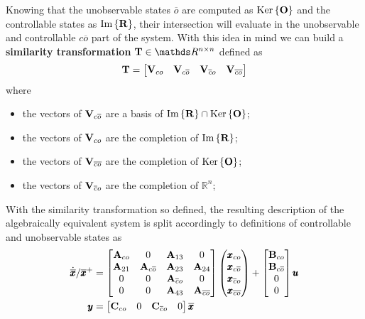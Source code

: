 	Knowing that the unobservable states $\overline o$ are computed as $\textrm{Ker}\left\{\mathbf{O}\right\}$ and the controllable states as $\textrm{Im}\left\{\mathbf{R}\right\}$, their intersection will evaluate in the unobservable and controllable $c\overline o$ part of the system. With this idea in mind we can build a \textbf{similarity transformation} $\T \in \mathds R^{n\times n}$ defined as
	\begin{equation}
		\mathbf{T}= \begin{bmatrix}  \mathbf{V}_{co} &  \mathbf{V}_{c\overline o} & \mathbf{V}_{\overline co} & \mathbf{V}_{\overline{co}}  \end{bmatrix}
	\end{equation}
	where
	\begin{itemize}
		\item the vectors of $\mathbf{V}_{c\overline o}$ are a basis of $\textrm{Im}\left\{\mathbf{R}\right\} \cap \textrm{Ker}\left\{\mathbf{O}\right\}$;
		\item the vectors of $\mathbf{V}_{c o}$ are the completion of $\textrm{Im}\left\{\mathbf{R}\right\}$;
		\item the vectors of $\mathbf{V}_{\overline{c o}}$ are the completion of $\textrm{Ker}\left\{\mathbf{O}\right\}$;
		\item the vectors of $\mathbf{V}_{\overline c o}$ are the completion of $\mathds R^n$;
	\end{itemize}
	With the similarity transformation so defined, the resulting description of the algebraically equivalent system is split accordingly to definitions of controllable and unobservable states as
	\begin{equation} \label{eq:kal:decomp}
	\begin{split}
		\dot{\overline {\pmb{x}}}/\overline {\pmb{x}}^+ & = \begin{bmatrix}  \mathbf{A}_{co} & 0 & \mathbf{A}_{13} & 0 \\
		\mathbf{A}_{21} & \mathbf{A}_{c\overline o} & \mathbf{A}_{23} & \mathbf{A}_{24} \\ 0 & 0 & \mathbf{A}_{\overline co} & 0 \\
		0 & 0 & \mathbf{A}_{43} & \mathbf{A}_{\overline{co}}   \end{bmatrix} \begin{pmatrix} \pmb{x}_{co} \\ \pmb{x}_{c\overline o} \\ \pmb{x}_{\overline co} \\ \pmb{x}_{\overline{co}}  \end{pmatrix} + \begin{bmatrix} \mathbf{B}_{co} \\ \mathbf{B}_{c\overline o} \\ 0 \\ 0 \end{bmatrix} \pmb{u} \\
		\pmb{y} & = \begin{bmatrix} \mathbf{C}_{co} & 0 & \mathbf{C}_{\overline c o} & 0 \end{bmatrix} \overline {\pmb{x}}
	\end{split}
	\end{equation}
